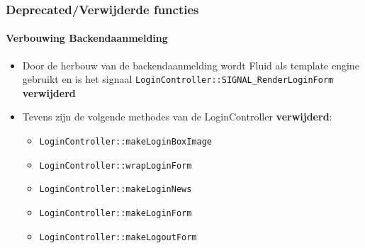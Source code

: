 \begin{frame}[fragile]
	\frametitle{Deprecated/Verwijderde functies}
	\framesubtitle{Verbouwing Backendaanmelding}

	\begin{itemize}

		\item Door de herbouw van de backendaanmelding wordt Fluid als template engine gebruikt
			en is het signaal
			\small\texttt{LoginController::SIGNAL\_RenderLoginForm}\normalsize\space
			\textbf{verwijderd}

		\item Tevens zijn de volgende methodes van de LoginController \textbf{verwijderd}:

			\begin{itemize}
				\item \texttt{LoginController::makeLoginBoxImage}
				\item \texttt{LoginController::wrapLoginForm}
				\item \texttt{LoginController::makeLoginNews}
				\item \texttt{LoginController::makeLoginForm}
				\item \texttt{LoginController::makeLogoutForm}
			\end{itemize}

	\end{itemize}

\end{frame}


